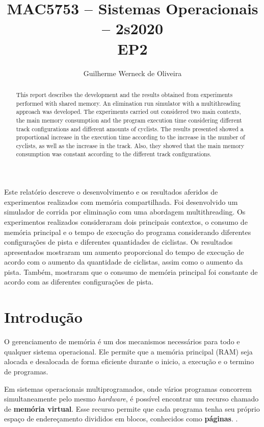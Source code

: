 \documentclass[12pt]{article}
\title{MAC5753 -- Sistemas Operacionais -- 2s2020\\ EP2}
\author{Guilherme Werneck de Oliveira\inst{1}}
\begin{document}
\maketitle

\begin{abstract}
  This report describes the development and the results obtained from experiments performed with shared memory. An elimination run simulator with a multithreading approach was developed. The experiments carried out considered two main contexts, the main memory consumption and the program execution time considering different track configurations and different amounts of cyclists. The results presented showed a proportional increase in the execution time according to the increase in the number of cyclists, as well as the increase in the track. Also, they showed that the main memory consumption was constant according to the different track configurations.
\end{abstract}

\begin{resumo}
  Este relatório descreve o desenvolvimento e os resultados aferidos de experimentos realizados com memória compartilhada. Foi desenvolvido um simulador de corrida por eliminação com uma abordagem multithreading. Os experimentos realizados consideraram dois principais contextos, o consumo de memória principal e o tempo de execução do programa considerando diferentes configurações de pista e diferentes quantidades de ciclistas. Os resultados apresentados mostraram um aumento proporcional do tempo de execução de acordo com o aumento da quantidade de ciclistas, assim como o aumento da pista. Também, mostraram que o consumo de memória principal foi constante de acordo com as diferentes configurações de pista.
\end{resumo}


\section{Introdução}

O gerenciamento de memória é um dos mecanismos necessários para todo e qualquer sistema operacional. Ele permite que a memória principal (RAM) seja alocada e desalocada de forma eficiente durante o inicio, a execução e o termino de programas.

Em sistemas operacionais multiprogramados, onde vários programas concorrem simultaneamente pelo mesmo \textit{hardware}, é possível encontrar um recurso chamado de \textbf{memória virtual}. Esse recurso permite que cada programa tenha seu próprio espaço de endereçamento divididos em blocos, conhecidos como \textbf{páginas}. \cite{tanenbaum:16}.
\end{document}
